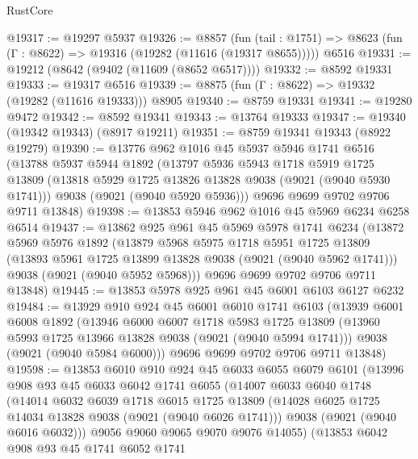\begin{lexlean}{RustCore}
\begin{coremodule}
@19317 := @19297 @5937
@19326 := @8857
    (fun (tail : @1751) => @8623 (fun (Γ : @8622) => @19316 (@19282 (@11616 (@19317 @8655)))))
    @6516
@19331 := @19212 (@8642 (@9402 (@11609 (@8652 @6517))))
@19332 := @8592 @19331
@19333 := @19317 @6516
@19339 := @8875 (fun (Γ : @8622) => @19332 (@19282 (@11616 @19333))) @8905
@19340 := @8759 @19331
@19341 := @19280 @9472
@19342 := @8592 @19341
@19343 := @13764 @19333
@19347 := @19340 (@19342 @19343) (@8917 @19211)
@19351 := @8759 @19341 @19343 (@8922 @19279)
@19390 := @13776
    @962
    @1016
    @45
    @5937
    @5946
    @1741
    @6516
    (@13788
      @5937
      @5944
      @1892
      (@13797
        @5936
        @5943
        @1718
        @5919
        @1725
        @13809
        (@13818 @5929 @1725 @13826 @13828 @9038 (@9021 (@9040 @5930 @1741)))
        @9038
        (@9021 (@9040 @5920 @5936)))
      @9696
      @9699
      @9702
      @9706
      @9711
      @13848)
@19398 := @13853 @5946 @962 @1016 @45 @5969 @6234 @6258 @6514
@19437 := @13862
    @925
    @961
    @45
    @5969
    @5978
    @1741
    @6234
    (@13872
      @5969
      @5976
      @1892
      (@13879
        @5968
        @5975
        @1718
        @5951
        @1725
        @13809
        (@13893 @5961 @1725 @13899 @13828 @9038 (@9021 (@9040 @5962 @1741)))
        @9038
        (@9021 (@9040 @5952 @5968)))
      @9696
      @9699
      @9702
      @9706
      @9711
      @13848)
@19445 := @13853 @5978 @925 @961 @45 @6001 @6103 @6127 @6232
@19484 := @13929
    @910
    @924
    @45
    @6001
    @6010
    @1741
    @6103
    (@13939
      @6001
      @6008
      @1892
      (@13946
        @6000
        @6007
        @1718
        @5983
        @1725
        @13809
        (@13960 @5993 @1725 @13966 @13828 @9038 (@9021 (@9040 @5994 @1741)))
        @9038
        (@9021 (@9040 @5984 @6000)))
      @9696
      @9699
      @9702
      @9706
      @9711
      @13848)
@19598 := @13853
    @6010
    @910
    @924
    @45
    @6033
    @6055
    @6079
    @6101
    (@13996
      @908
      @93
      @45
      @6033
      @6042
      @1741
      @6055
      (@14007
        @6033
        @6040
        @1748
        (@14014
          @6032
          @6039
          @1718
          @6015
          @1725
          @13809
          (@14028 @6025 @1725 @14034 @13828 @9038 (@9021 (@9040 @6026 @1741)))
          @9038
          (@9021 (@9040 @6016 @6032)))
        @9056
        @9060
        @9065
        @9070
        @9076
        @14055)
      (@13853
        @6042
        @908
        @93
        @45
        @1741
        @6052
        @1741

\end{coremodule}
\end{lexlean}
